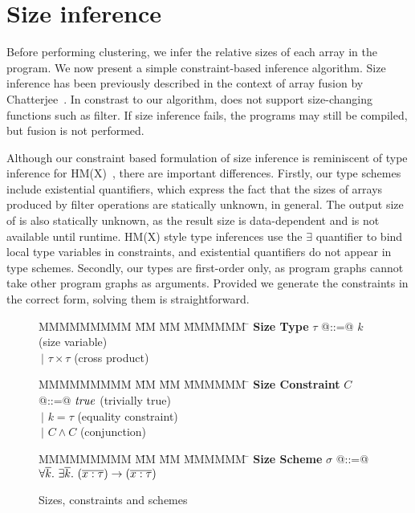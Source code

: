\section{Size inference}
Before performing clustering, we infer the relative sizes of each array in the program.
We now present a simple constraint-based inference algorithm.
Size inference has been previously described in the context of array fusion by Chatterjee~\cite{chatterjee1991size}.
In constrast to our algorithm, \cite{chatterjee1991size} does not support size-changing functions such as filter.
If size inference fails, the programs may still be compiled, but fusion is not performed.

Although our constraint based formulation of size inference is reminiscent of type inference for HM(X)~\cite{odersky1999type}, there are important differences.
Firstly, our type schemes include existential quantifiers, which express the fact that the sizes of arrays produced by filter operations are statically unknown, in general.
The output size of \Hs@generate@ is also statically unknown, as the result size is data-dependent and is not available until runtime.
HM(X) style type inferences use the $\exists$ quantifier to bind local type variables in constraints, and existential quantifiers do not appear in type schemes.
Secondly, our types are first-order only, as program graphs cannot take other program graphs as arguments.
Provided we generate the constraints in the correct form, solving them is straightforward.


\begin{figure}
\begin{tabbing}
MMMMMMMMM \= MM  \= MM \= MMMMMM \= \kill
\textbf{Size Type}
\> $\tau$   \> @::=@  \> $k$                  \> (size variable)       \\
\>          \> $~|$   \> $\tau \times \tau$   \> (cross product)
\end{tabbing}

\begin{tabbing}
MMMMMMMMM \= MM  \= MM \= MMMMMM \= \kill
\textbf{Size Constraint}
\> $C$      \> @::=@  \> $\mathit{true}$               \> (trivially true)      \\
\>          \> $~|$   \> $k = \tau$           \> (equality constraint) \\
\>          \> $~|$   \> $C \wedge C$         \> (conjunction)
\end{tabbing}

\begin{tabbing}
MMMMMMMMM \= MM  \= MM \= MMMMMM \= \kill
\textbf{Size Scheme}
\> $\sigma$ \> @::=@  
        \> $\forall \overline{k}.~ \exists \overline{k}.~ (\overline{ x : \tau }) \to (\overline{x : \tau})$
\end{tabbing}

\caption{Sizes, constraints and schemes}
\label{clustering:f:constraints}
\end{figure}


